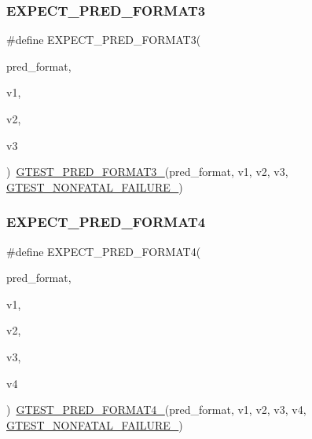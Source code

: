 \mbox{\label{_obj__test_2lib_2googletest-master_2googletest_2include_2gtest_2gtest__pred__impl_8h_a7285708fa5d37d6d8ed5b5e59da08bae}} 
\subsubsection{\texorpdfstring{EXPECT\_PRED\_FORMAT3}{EXPECT\_PRED\_FORMAT3}}
{\footnotesize\ttfamily \#define E\+X\+P\+E\+C\+T\+\_\+\+P\+R\+E\+D\+\_\+\+F\+O\+R\+M\+A\+T3(\begin{DoxyParamCaption}\item[{}]{pred\+\_\+format,  }\item[{}]{v1,  }\item[{}]{v2,  }\item[{}]{v3 }\end{DoxyParamCaption})~\mbox{\hyperlink{_obj__test_2lib_2googletest-release-1_88_81_2googletest_2include_2gtest_2gtest__pred__impl_8h_a49cdf8707268ee932bb772d879a226cc}{G\+T\+E\+S\+T\+\_\+\+P\+R\+E\+D\+\_\+\+F\+O\+R\+M\+A\+T3\+\_\+}}(pred\+\_\+format, v1, v2, v3, \mbox{\hyperlink{_obj__test_2lib_2googletest-release-1_88_81_2googletest_2include_2gtest_2internal_2gtest-internal_8h_a6cb7482cfa03661a91c698eb5895f642}{G\+T\+E\+S\+T\+\_\+\+N\+O\+N\+F\+A\+T\+A\+L\+\_\+\+F\+A\+I\+L\+U\+R\+E\+\_\+}})}

\mbox{\label{_obj__test_2lib_2googletest-master_2googletest_2include_2gtest_2gtest__pred__impl_8h_a3354347de0f2445400b509cf39dce1dc}} 
\subsubsection{\texorpdfstring{EXPECT\_PRED\_FORMAT4}{EXPECT\_PRED\_FORMAT4}}
{\footnotesize\ttfamily \#define E\+X\+P\+E\+C\+T\+\_\+\+P\+R\+E\+D\+\_\+\+F\+O\+R\+M\+A\+T4(\begin{DoxyParamCaption}\item[{}]{pred\+\_\+format,  }\item[{}]{v1,  }\item[{}]{v2,  }\item[{}]{v3,  }\item[{}]{v4 }\end{DoxyParamCaption})~\mbox{\hyperlink{_obj__test_2lib_2googletest-release-1_88_81_2googletest_2include_2gtest_2gtest__pred__impl_8h_abd207ed869491ba4bba29f8df37b7355}{G\+T\+E\+S\+T\+\_\+\+P\+R\+E\+D\+\_\+\+F\+O\+R\+M\+A\+T4\+\_\+}}(pred\+\_\+format, v1, v2, v3, v4, \mbox{\hyperlink{_obj__test_2lib_2googletest-release-1_88_81_2googletest_2include_2gtest_2internal_2gtest-internal_8h_a6cb7482cfa03661a91c698eb5895f642}{G\+T\+E\+S\+T\+\_\+\+N\+O\+N\+F\+A\+T\+A\+L\+\_\+\+F\+A\+I\+L\+U\+R\+E\+\_\+}})}

